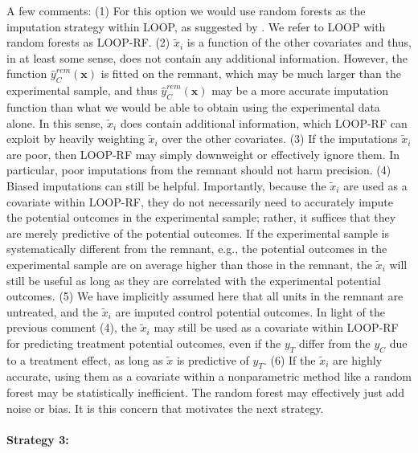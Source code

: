 A few comments:
(1) For this option we would use random forests as the imputation strategy within LOOP, as suggested by \cite{loop}.  We refer to LOOP with random forests as LOOP-RF.
(2) $\tilde{x}_{i}$ is a function of the other covariates and thus, in at least some sense, does not contain any additional information.  However, the function $\hat{y}_C^{rem}(\mathbf{x})$  is fitted on the remnant, which may be much larger than the experimental sample, and thus $\hat{y}_C^{rem}(\mathbf{x})$ may be a more accurate imputation function than what we would be able to obtain using the experimental data alone.  In this sense, $\tilde{x}_{i}$ does contain additional information, which LOOP-RF can exploit by heavily weighting $\tilde{x}_{i}$ over the other covariates.
(3) If the imputations $\tilde{x}_{i}$ are poor, then LOOP-RF may simply downweight or effectively ignore them.  In particular, poor imputations from the remnant should not harm precision.
(4) Biased imputations can still be helpful.  Importantly, because the $\tilde{x}_{i}$ are used as a covariate within LOOP-RF, they do not necessarily need to accurately impute the potential outcomes in the experimental sample; rather, it suffices that they are merely predictive of the potential outcomes.  If the experimental sample is systematically different from the remnant,  e.g., the potential outcomes in the experimental sample are on average higher than those in the remnant, the $\tilde{x}_{i}$ will still be useful as long as they are correlated with the experimental potential outcomes.
(5) We have implicitly assumed here that all units in the remnant are untreated, and the $\tilde{x}_{i}$ are imputed control potential outcomes.  In light of the previous comment (4), the $\tilde{x}_{i}$ may still be used as a covariate within LOOP-RF for predicting treatment potential outcomes, even if the $y_T$ differ from the $y_C$ due to a treatment effect, as long as $\tilde{x}$ is predictive of $y_T$.
(6) If the $\tilde{x}_{i}$ are highly accurate, using them as a covariate within a nonparametric method like a random forest may be statistically inefficient.  The random forest may effectively just add noise or bias.  It is this concern that motivates the next strategy.


\paragraph{Strategy 3:}

